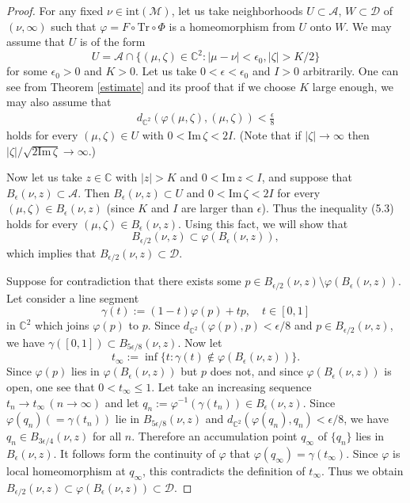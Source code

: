 \documentclass[12pt]{article}
\theoremstyle{plain}
\theoremstyle{definition}
\theoremstyle{remark}
\newcommand{\C}{\mathbb C}
\newcommand{\D}{\mathcal D}
\newcommand{\M}{\mathcal M}
\newcommand{\A}{\mathcal A}
\newcommand{\fty}{\infty}
\newcommand{\ep}{\epsilon}
\newcommand{\sm}{\setminus}
\newcommand{\ze}{\zeta}
\newcommand{\vphi}{\varphi}
\newcommand{\Tr}{{\mathrm{Tr}}}
\newcommand{\inte}{\mathrm{int}}
\newcommand{\im}{\mathrm{Im}}
\begin{document}
\begin{proof}
For any fixed $\nu \in \inte(\M)$, let us take 
 neighborhoods $U \subset \A$, $W \subset \D$ 
 of $(\nu,\fty)$ such that $\vphi=F \circ \Tr \circ \Phi$ is a homeomorphism from $U$ onto $W$. 
We may assume that $U$ is of the form  
$$
U=\A \cap \{(\mu,\ze) \in \C^2 : |\mu-\nu|<\ep_0, |\ze|>K/2\}
$$
for some $\ep_0>0$ and $K>0$. 
Let us take $0< \ep<\ep_0$ and $I>0$ arbitrarily.   
One can see from Theorem \ref{estimate} and its proof that  if we choose $K$ large enough, 
we may also assume that 
\begin{eqnarray}
d_{\C^2}(\vphi(\mu,\ze),(\mu,\ze))<\frac{\ep}{8}
\end{eqnarray}
holds for every $(\mu,\ze) \in U$ with  $0<\im\,\ze<2I$. 
(Note that if $|\ze| \to \fty$ then $|\ze|/\sqrt{2 \im\,\ze} \to \fty$.)

Now let us take $z \in \C$ with $|z|>K$ and $0<\im\,z<I$, 
and suppose that $B_\ep(\nu,z) \subset \A$.  
Then  $B_\ep(\nu,z) \subset U$ and $0<\im\,\ze<2I$ for every 
$(\mu,\ze) \in B_\ep(\nu,z)$  
(since $K$ and $I$ are larger than $\ep$). 
Thus the inequality (5.3) holds for every $(\mu,\ze) \in B_{\ep}(\nu,z)$. 
Using this fact, we will show that 
$$
B_{\ep/2}(\nu,z) \subset \varphi(B_\ep(\nu,z)),  
$$
which implies that $B_{\ep/2}(\nu,z) \subset \D$. 

Suppose for contradiction that there exists some 
$p \in B_{\ep/2}(\nu,z) \sm  \varphi(B_\ep(\nu,z))$. 
Let consider a line segment 
$$
\gamma(t):=(1-t)\varphi(p) +t p, \quad t \in [0,1]
$$
in $\C^2$ which joins $\varphi(p)$ to $p$. 
Since $d_{\C^2}(\vphi(p),p)<\ep/8$ and $p \in B_{\ep/2}(\nu,z)$,  we have 
$\gamma([0,1]) \subset B_{5\ep/8}(\nu,z)$.  
Now let 
$$
t_\fty:=\inf\{t : \gamma(t)  \not\in \varphi(B_\ep(\nu,z))\}. 
$$
Since $\varphi(p)$ lies in $\varphi(B_\ep(\nu,z))$ but $p$ does not,  
and since $\varphi(B_\ep(\nu,z))$ is open, one see that $0<t_\fty \le 1$. 
Let take an increasing sequence $t_n \to t_\fty \, (n \to \fty)$ 
and let $q_n:=\varphi^{-1}(\gamma(t_n)) \in B_\ep(\nu,z)$. 
Since $\varphi(q_n)(=\gamma(t_n))$ lie in $B_{5\ep/8}(\nu,z)$ and 
$d_{\C^2}(\varphi(q_n),q_n)<\ep/8$, we have 
$q_n \in B_{3\ep/4}(\nu,z)$ for all $n$. 
Therefore an accumulation point $q_\fty$ of $\{q_n\}$ 
lies in $B_{\ep}(\nu,z)$. 
It follows form the continuity of $\varphi$ that $\varphi(q_\fty)=\gamma(t_\fty)$. 
Since $\varphi$ is local homeomorphism at $q_\fty$, 
this contradicts the definition of $t_\fty$. 
Thus we obtain $B_{\ep/2}(\nu,z) \subset \varphi(B_\ep(\nu,z)) \subset \D$. 
 \end{proof}
\end{document}
